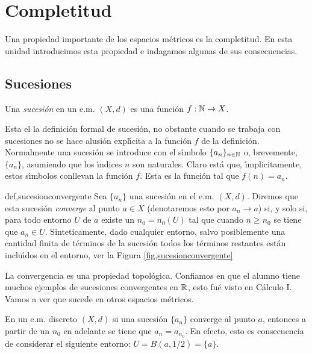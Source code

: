  \section{Completitud}

Una propiedad importante de los espacios métricos es la
completitud. En esta unidad introducimos esta propiedad e
indagamos algunas de sus consecuencias.
\subsection{Sucesiones}
\begin{definicion}{} Una \emph{sucesión} en un e.m. $(X,d)$ es una
función $f:\mathbb{N}\rightarrow X$.
\end{definicion}

Esta el la definición formal de sucesión, no obstante cuando
se trabaja con sucesiones no se hace alusión expl\'{\i}cita a la
función $f$ de la definición. Normalmente una sucesión se
introduce con el s\'{\i}mbolo $\{a_n\}_{n\in\mathbb{N}}$ o, brevemente,
$\{a_n\}$, asumiendo que los \'{\i}ndices $n$ son naturales. Claro
está que, \'{\i}mplicitamente, estos s\'{\i}mbolos conllevan la
función $f$. Esta es la función tal que $f(n)=a_n$.

\begin{definicion}{def,sucesionconvergente} Sea $\{a_n\}$ una sucesión en el e.m.
$(X,d)$. Diremos que esta sucesión \emph{converge} al punto
$a\in X$ (denotaremos esto por $a_n\rightarrow a$) si, y solo si,
para todo entorno $U$ de $a$ existe un $n_0=n_0(U)$ tal que cuando
$n\geq n_0$ se tiene que $a_n\in U$. Sinteticamente, dado
cualquier entorno, salvo posiblemente una cantidad finita de
términos de la sucesión todos los términos restantes están
inclu\'{\i}dos en el entorno, ver la Figura
\vref{fig,sucesionconvergente}
\end{definicion}


La convergencia es una propiedad topológica. Confiamos en que el
alumno tiene muchos ejemplos de sucesiones convergentes en $\mathbb{R}$,
esto fué visto en Cálculo I. Vamos a ver que sucede en otros
espacios métricos.

\begin{ejemplo}{} En un e.m. discreto $(X,d)$ si una sucesión
$\{a_n\}$  converge al punto $a$, entonces a partir de un $n_0$ en
adelante se tiene que $a_n=a_{n_0}$. En efecto, esto es
consecuencia de considerar el siguiente entorno:
$U=B(a,1/2)=\{a\}$.
\end{ejemplo}

